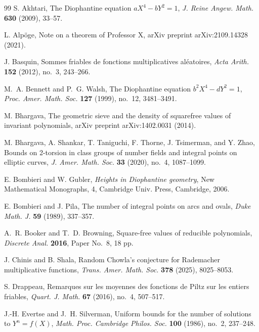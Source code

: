 \documentclass[reqno, 12pt]{amsart}
\theoremstyle{plain}
\theoremstyle{definition}
\theoremstyle{remark}
\begin{document}
\begin{thebibliography}{99} 
S. Akhtari, The Diophantine equation $aX^4-bY^2=1$, {\em J. Reine Angew. Math.} {\bf 630} (2009), 33--57.

L. Alp\"{o}ge,
Note on a theorem of Professor X,
arXiv preprint arXiv:2109.14328 (2021).

J. Basquin, Sommes friables de fonctions multiplicatives aléatoires, {\it Acta Arith.} {\bf 152} (2012), no.~3,  243--266.


M.~A. Bennett and P.~G. Walsh, The Diophantine equation $b^2X^4-dY^2=1$, {\em Proc. Amer. Math. Soc.} {\bf 127} (1999), no.~12, 3481--3491.

M. Bhargava,
The geometric sieve and the density of squarefree values of invariant polynomials,
arXiv preprint arXiv:1402.0031 (2014).

M. Bhargava, A. Shankar, T. Taniguchi, F. Thorne, J. Tsimerman, and Y. Zhao, Bounds on 2-torsion in class groups of number fields and integral points on elliptic curves, {\em J. Amer. Math. Soc.} {\bf 33} (2020), no.~4, 1087--1099.

E. Bombieri and W. Gubler, {\it Heights in Diophantine geometry}, New Mathematical Monographs, 4, Cambridge Univ. Press, Cambridge, 2006.

E. Bombieri and J. Pila,
The number of integral points on arcs and ovals,
{\em Duke Math. J.} {\bf 59} (1989), 337--357.

A.~R. Booker and T.~D. Browning, Square-free values of reducible polynomials, {\em Discrete Anal.} {\bf 2016}, Paper No.~8, 18 pp.

 J. Chinis and B. Shala,
Random Chowla's conjecture for Rademacher multiplicative functions,
{\it Trans. Amer. Math. Soc.} {\bf 378} (2025), 8025--8053.


 S. Drappeau,  Remarques sur les moyennes des fonctions de Piltz sur les entiers friables,
{\em Quart. J. Math.} {\bf 67} (2016), no.~4, 507--517.

 J.-H. Evertse and J.~H. Silverman, Uniform bounds for the number of solutions to $Y^n=f(X)$, {\em Math. Proc. Cambridge Philos. Soc.} {\bf 100} (1986), no.~2, 237--248.


\end{thebibliography}
\end{document}
